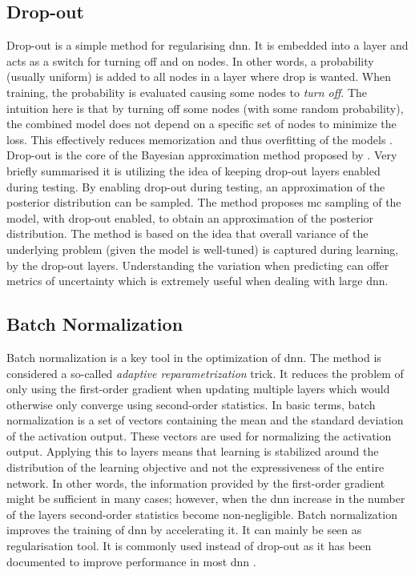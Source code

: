 \subsection{Drop-out}\label{subsec:dropout}
Drop-out is a simple method for regularising \gls{dnn}. It is embedded into a layer and acts as a switch for turning off and on nodes. In other words, a probability (usually uniform) is added to all nodes in a layer where drop is wanted. When training, the probability is evaluated causing some nodes to \emph{turn off}. The intuition here is that by turning off some nodes (with some random probability), the combined model does not depend on a specific set of nodes to minimize the loss. This effectively reduces memorization and thus overfitting of the models \cite{Goodfellow-et-al-2016}. Drop-out is the core of the Bayesian approximation method proposed by \cite{Gal2015DropoutLearning}. Very briefly summarised it is utilizing the idea of keeping drop-out layers enabled during testing. By enabling drop-out during testing, an approximation of the posterior distribution can be sampled. The method proposes \gls{mc} sampling of the model, with drop-out enabled, to obtain an approximation of the posterior distribution. The method is based on the idea that overall variance of the underlying problem (given the model is well-tuned) is captured during learning, by the drop-out layers. Understanding the variation when predicting can offer metrics of uncertainty which is extremely useful when dealing with large \gls{dnn}.



\subsection{Batch Normalization}\label{subsec:batch_normalization}
Batch normalization is a key tool in the optimization of \gls{dnn}. The method is considered a so-called \emph{adaptive reparametrization} trick. It reduces the problem of only using the first-order gradient when updating multiple layers which would otherwise only converge using second-order statistics. In basic terms, batch normalization is a set of vectors containing the mean and the standard deviation of the activation output. These vectors are used for normalizing the activation output. Applying this to layers means that learning is stabilized around the distribution of the learning objective and not the expressiveness of the entire network. In other words, the information provided by the first-order gradient might be sufficient in many cases; however, when the \gls{dnn} increase in the number of the layers second-order statistics become non-negligible. Batch normalization improves the training of \gls{dnn} by accelerating it. It can mainly be seen as regularisation tool. It is commonly used instead of drop-out as it has been documented to improve performance in most \gls{dnn} \cite{Goodfellow-et-al-2016}.



